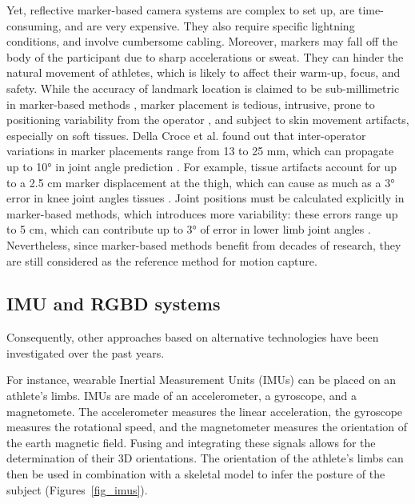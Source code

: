 Yet, reflective marker-based camera systems are complex to set up, are time-consuming, and are very expensive. They also require specific lightning conditions, and involve cumbersome cabling. Moreover, markers may fall off the body of the participant due to sharp accelerations or sweat. They can hinder the natural movement of athletes, which is likely to affect their warm-up, focus, and safety. While the accuracy of landmark location is claimed to be sub-millimetric in marker-based methods \cite{Topley2020}, marker placement is tedious, intrusive, prone to positioning variability from the operator \cite{Tsushima2003}, and subject to skin movement artifacts, especially on soft tissues. Della Croce et al. found out that inter-operator variations in marker placements range from 13 to 25 mm, which can propagate up to 10° in joint angle prediction \cite{Gorton2009,Croce1999}. For example, tissue artifacts account for up to a 2.5 cm marker displacement at the thigh, which can cause as much as a 3° error in knee joint angles tissues \cite{Benoit2015,Cappozzo1995}. Joint positions must be calculated explicitly in marker-based methods, which introduces more variability: these errors range up to 5 cm, which can contribute up to 3° of error in lower limb joint angles \cite{Leboeuf2019}. Nevertheless, since marker-based methods benefit from decades of research, they are still considered as the reference method for motion capture.


\FloatBarrier
\subsection{IMU and RGBD systems}

Consequently, other approaches based on alternative technologies have been investigated over the past years. 

For instance, wearable Inertial Measurement Units (IMUs) can be placed on an athlete's limbs. IMUs are made of an accelerometer, a gyroscope, and a magnetomete. The accelerometer measures the linear acceleration, the gyroscope measures the rotational speed, and the magnetometer measures the orientation of the earth magnetic field. Fusing and integrating these signals allows for the determination of their 3D orientations. The orientation of the athlete's limbs can then be used in combination with a skeletal model to infer the posture of the subject (Figures~\ref{fig_imus}).

